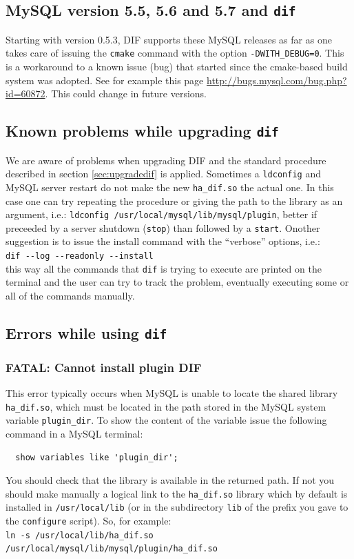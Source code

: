 \documentclass[10pt,titlepage]{article}
\begin{document}
\subsection{MySQL version 5.5, 5.6 and 5.7 and \tt{dif}}
Starting with version 0.5.3, DIF supports these MySQL releases as far as
one takes care of issuing the \verb|cmake| command with the option
\verb|-DWITH_DEBUG=0|. This is a workaround to a known issue (bug) that
started since the cmake-based build system was adopted. See for example this
page \url{http://bugs.mysql.com/bug.php?id=60872}. This could change in
future versions.

\subsection{Known problems while upgrading \tt{dif}}
We are aware of problems when upgrading DIF and the standard procedure
described in section \ref{sec:upgradedif} is applied. Sometimes a
\verb|ldconfig| and MySQL server restart do not make the new
\verb|ha_dif.so| the actual one. In this case one can try repeating the
procedure or giving the path to the library as an argument, i.e.:
\verb|ldconfig /usr/local/mysql/lib/mysql/plugin|, better if preceeded
by a server shutdown (\verb|stop|) than followed by a \verb|start|.
Onother suggestion is to issue the install command with the ``verbose''
options, i.e.:\\
\verb|dif --log --readonly --install|
\\
this way all the commands that \verb|dif| is trying to execute are printed on
the terminal and the user can try to track the problem, eventually executing
some or all of the commands manually.

\subsection{Errors while using \tt{dif}}
\subsubsection{FATAL: Cannot install plugin DIF}
This error typically occurs when MySQL is unable to locate the shared library
\verb|ha_dif.so|, which must be located in the path stored in the MySQL
system variable \verb|plugin_dir|. To show the content of the variable issue
the following command in a MySQL terminal:
%
\begin{verbatim}
  show variables like 'plugin_dir';
\end{verbatim}
%
You should check that the library is available in the returned path. If
not you should make manually a logical link to the \verb|ha_dif.so|
library which by
default is installed in \verb|/usr/local/lib| (or in the subdirectory
\verb|lib| of the prefix you gave to the \verb|configure| script).
So, for example: \\
\verb|ln -s /usr/local/lib/ha_dif.so|
\verb|/usr/local/mysql/lib/mysql/plugin/ha_dif.so|
\end{document}
